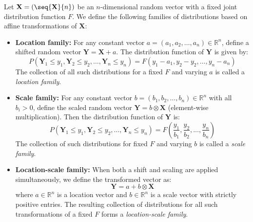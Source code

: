 \begin{definition}
	Let $\mathbf{X} = (\seq{\mathbf{X}}{n})$ be an $n$-dimensional random vector with a fixed joint distribution function $F$. We define the following families of distributions based on affine transformations of $\mathbf{X}$:
	
	\begin{itemize}
		\item \textbf{Location family:}  
		For any constant vector $a = (a_1, a_2, \dots, a_n) \in \mathbb{R}^n$, define a shifted random vector $\mathbf{Y} = \mathbf{X} + a$. The distribution function of $\mathbf{Y}$ is given by:
		\[
		P(\mathbf{Y}_1 \leqslant y_1, \mathbf{Y}_2 \leqslant y_2, \dots, \mathbf{Y}_n \leqslant y_n) = F(y_1 - a_1, y_2 - y_2, \dots, y_n - a_n)
		\]
		The collection of all such distributions for a fixed $F$ and varying $a$ is called a \emph{location family}.
		
		\item \textbf{Scale family:}  
		For any constant vector $b = (b_1, b_2, \dots, b_n) \in \mathbb{R}^n$ with all $b_i > 0$, define the scaled random vector $\mathbf{Y} = b \otimes \mathbf{X}$ (element-wise multiplication). Then the distribution function of $\mathbf{Y}$ is:
		\[
		P(\mathbf{Y}_1 \leqslant y_1, \mathbf{Y}_2 \leqslant y_2, \dots, \mathbf{Y}_n \leqslant y_n) = F\left(\frac{y_1}{b_1}, \frac{y_2}{b_2}, \dots, \frac{y_n}{b_n}\right)
		\]
		The collection of such distributions for fixed $F$ and varying $b$ is called a \emph{scale family}.
		
		\item \textbf{Location-scale family:}  
		When both a shift and scaling are applied simultaneously, we define the transformed vector as:
		\[
		\mathbf{Y} = a + b \otimes \mathbf{X}
		\]
		where $a \in \mathbb{R}^n$ is a location vector and $b \in \mathbb{R}^n$ is a scale vector with strictly positive entries. The resulting collection of distributions for all such transformations of a fixed $F$ forms a \emph{location-scale family}.
	\end{itemize}
\end{definition}

